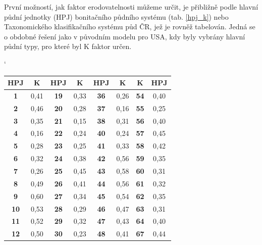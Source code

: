 První možností, jak faktor erodovatelnosti můžeme určit, je přibližně podle hlavní půdní jednotky (HPJ) bonitačního půdního systému (tab. \ref{hpj_k}) nebo Taxonomického klasifikačního systému půd ČR\cite{Nemecek2001}, jež je rovněž tabelován\cite{janecek2012}. Jedná se o obdobné řešení jako v původním modelu pro USA, kdy byly vybrány hlavní půdní typy, pro které byl K faktor určen.\cite{usle1978}

\begin{table}[hbt]
\begin{center}
\catcode`
    \noindent\begin{tabular}{|*{8}{c|}}
      \hline
      \bf HPJ & \bf K & \bf HPJ & \bf K & \bf HPJ & \bf K& \bf K & \bf HPJ\\
      \hline 
\bf      1 &0,41  &\bf 19&0,33 &\bf  36&0,26 &\bf 54&0,40 \\
   \hline                                                 
\bf      2 &0,46  &\bf 20&0,28 &\bf  37&0,16 &\bf 55&0,25 \\
   \hline                                                 
\bf      3 &0,35  &\bf 21&0,15 &\bf  38&0,31 &\bf 56&0,40 \\
   \hline                                                 
\bf      4 &0,16  &\bf 22&0,24 &\bf  40&0,24 &\bf 57&0,45 \\
   \hline                                                 
\bf      5 &0,28  &\bf 23&0,25 &\bf  41&0,33 &\bf 58&0,42 \\
   \hline                                          
\bf      6 &0,32  &\bf 24&0,38 &\bf  42&0,56 &\bf 59&0,35 \\
   \hline                                          
\bf      7 &0,26  &\bf 25&0,45 &\bf  43&0,58 &\bf 60&0,31 \\
   \hline                                                
\bf      8 &0,49  &\bf 26&0,41 &\bf  44&0,56 &\bf 61&0,32 \\
   \hline                                                 
\bf      9 &0,60  &\bf 27&0,34 &\bf  45&0,54 &\bf 62&0,35 \\
   \hline                                                 
\bf      10&0,53  &\bf 28&0,29 &\bf  46&0,47 &\bf 63&0,31 \\
   \hline                                                 
\bf      11&0,52  &\bf 29&0,32 &\bf  47&0,43 &\bf 64&0,40 \\
   \hline                                                      
\bf      12&0,50  &\bf 30&0,23 &\bf  48&0,41 &\bf 67&0,44 \\

\end{tabular}
\end{center}
\end{table}
